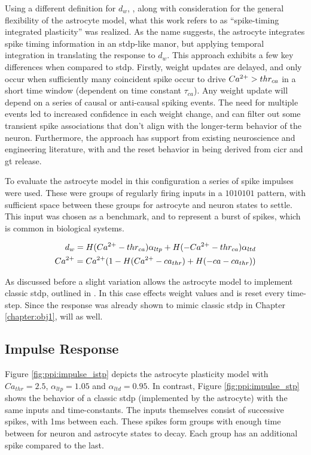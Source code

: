 Using a different definition for $d_w$, , along with
consideration for the general flexibility of the astrocyte model, what this work
refers to as ``spike-timing integrated plasticity'' was realized. As the name
suggests, the astrocyte integrates spike timing information in an
\gls{stdp}-like manor, but applying temporal integration in translating the \ca
response to $d_w$. This approach exhibits a few key differences when compared to
\gls{stdp}. Firstly, weight updates are delayed, and only occur when
sufficiently many coincident spike occur to drive \ca $Ca^{2+}>thr_{ca}$ in a short
time window (dependent on time constant $\tau_{ca}$). Any weight update will
depend on a series of causal or anti-causal spiking events. The need for
multiple events led to increased confidence in each weight change, and can
filter out some transient spike associations that don't align with the
longer-term behavior of the neuron. Furthermore, the approach has support from
existing neuroscience and engineering literature, with  and the
reset behavior in  being derived from \gls{cicr} and
\gls{gt} release.

To evaluate the astrocyte model in this configuration a series of spike impulses
were used. These were groups of regularly firing inputs in a $1010101$ pattern,
with sufficient space between these groups for astrocyte and neuron states to
settle. This input was chosen as a benchmark, and to represent a burst of spikes,
which is common in biological systems.

\begin{align}
  d_w = H(Ca^{2+} - thr_{ca}) \alpha_{ltp} + H(-Ca^{2+} - thr_{ca})
  \alpha_{ltd} \label{eq:obj2:dw} \\
  Ca^{2+} = Ca^{2+} (1 - H(Ca^{2+} - ca_{thr}) +  H(-ca - ca_{thr})) \label{eq:obj2:ca_reset}
\end{align}

As discussed before a slight variation allows the astrocyte model to implement
classic \gls{stdp}, outlined in . In this case \ca
effects weight values and is reset every time-step. Since the \ca response was
already shown to mimic classic \gls{stdp} in Chapter \ref{chapter:obj1},
 will as well.

\subsection{Impulse Response}
Figure \ref{fig:ppi:impulse_istp} depicts the astrocyte plasticity model with
$Ca_{thr}=2.5$, $\alpha_{ltp}=1.05$ and $\alpha_{ltd}=0.95$. In contrast, Figure
\ref{fig:ppi:impulse_stp} shows the behavior of a classic \gls{stdp} (implemented by
the astrocyte) with the same inputs and time-constants. The inputs themselves
consist of successive spikes, with 1ms between each. These spikes form groups
with enough time between for neuron and astrocyte states to decay. Each group
has an additional spike compared to the last.

